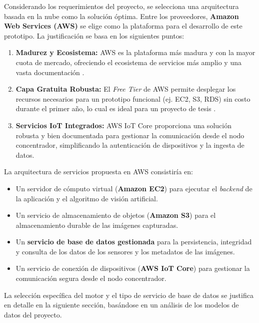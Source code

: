 


Considerando los requerimientos del proyecto, se selecciona una arquitectura basada en la nube como la solución óptima. Entre los proveedores, \textbf{Amazon Web Services (AWS)} se elige como la plataforma para el desarrollo de este prototipo. La justificación se basa en los siguientes puntos:

\begin{enumerate}
    \item \textbf{Madurez y Ecosistema:} AWS es la plataforma más madura y con la mayor cuota de mercado, ofreciendo el ecosistema de servicios más amplio y una vasta documentación \cite{coursera2024}.
    \item \textbf{Capa Gratuita Robusta:} El \textit{Free Tier} de AWS permite desplegar los recursos necesarios para un prototipo funcional (ej. EC2, S3, RDS) sin costo durante el primer año, lo cual es ideal para un proyecto de tesis \cite{aws2024freetier}.
    \item \textbf{Servicios IoT Integrados:} AWS IoT Core proporciona una solución robusta y bien documentada para gestionar la comunicación desde el nodo concentrador, simplificando la autenticación de dispositivos y la ingesta de datos.
\end{enumerate}

La arquitectura de servicios propuesta en AWS consistiría en:
\begin{itemize}
    \item Un servidor de cómputo virtual (\textbf{Amazon EC2}) para ejecutar el \textit{backend} de la aplicación y el algoritmo de visión artificial.
    \item Un servicio de almacenamiento de objetos (\textbf{Amazon S3}) para el almacenamiento durable de las imágenes capturadas.
    \item Un \textbf{servicio de base de datos gestionada} para la persistencia, integridad y consulta de los datos de los sensores y los metadatos de las imágenes.
    \item Un servicio de conexión de dispositivos (\textbf{AWS IoT Core}) para gestionar la comunicación segura desde el nodo concentrador.
\end{itemize}

La selección específica del motor y el tipo de servicio de base de datos se justifica en detalle en la siguiente sección, basándose en un análisis de los modelos de datos del proyecto.

